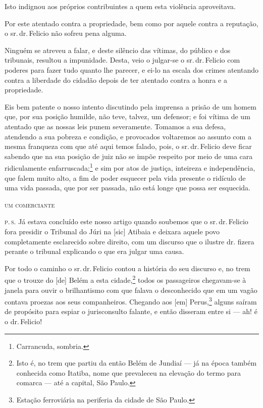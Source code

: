 Isto indignou aos próprios contribuintes a quem esta violência
aproveitava.

Por este atentado contra a propriedade, bem como por aquele contra a
reputação, o sr.\,dr.\,Felicio não sofreu pena alguma.

Ninguém se atreveu a falar, e deste silêncio das vítimas, do público e
dos tribunais, resultou a impunidade. Desta, veio o julgar-se o sr.\,dr.\,Felicio com poderes para fazer tudo quanto lhe parecer, e ei-lo na
escala dos crimes atentando contra a liberdade do cidadão depois de ter
atentado contra a honra e a propriedade.

Eis bem patente o nosso intento discutindo pela imprensa a prisão de um
homem que, por sua posição humilde, não teve, talvez, um defensor; e foi
vítima de um atentado que as nossas leis punem severamente. Tomamos a
sua defesa, atendendo a sua pobreza e condição, e provocados voltaremos
ao assunto com a mesma franqueza com que até aqui temos falado, pois, o
sr.\,dr.\,Felicio deve ficar sabendo que na sua posição de juiz não se
impõe respeito por meio de uma cara ridiculamente
enfarruscada;\footnote{ Carrancuda, sombria.} e sim por atos de
justiça, inteireza e independência, que falem muito alto, a fim de poder
esquecer pela vida presente o ridículo de uma vida passada, que por ser
passada, não está longe que possa ser esquecida.

\begin{flushright}
\textsc{um comerciante}
\end{flushright}

\textsc{p.\,s.} Já estava concluído este nosso artigo quando soubemos que o sr.\,dr.\,Felicio fora presidir o Tribunal do Júri na {[}sic{]} Atibaia e
deixara aquele povo completamente esclarecido sobre direito, com um
discurso que o ilustre dr. fizera perante o tribunal explicando o que
era julgar uma causa.

Por todo o caminho o sr.\,dr.\,Felicio contou a história do seu discurso
e, no trem que o trouxe do {[}de{]} Belém a esta cidade,\footnote{ Isto
  é, no trem que partiu da então Belém de Jundiaí --- já na época também
  conhecida como Itatiba, nome que prevaleceu na elevação do termo para
  comarca --- até a capital, São Paulo.} todos os passageiros chegavam-se
à janela para ouvir o brilhantismo com que falava o desconhecido que em
um vagão contava proezas aos seus companheiros. Chegando aos {[}em{]}
Perus,\footnote{ Estação ferroviária na periferia da cidade de São
  Paulo.} alguns saíram de propósito para espiar o jurisconsulto
falante, e então disseram entre si --- ah! é o dr.\,Felicio!

